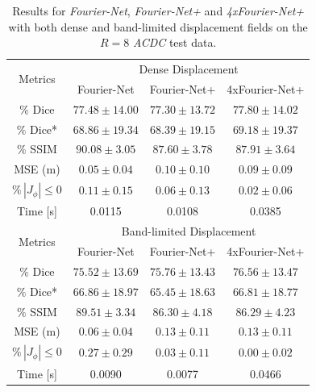 \begin{table}[h] %
	\centering
	\caption{Results for \emph{Fourier-Net}, \emph{Fourier-Net+} and \emph{4xFourier-Net+} with both dense and band-limited displacement fields on the $R=8$ \emph{ACDC} test data.}
	\label{tab:DenseDisplacementAcc8}
	\begin{tabular}{c c c c} %
		\toprule
		\multirow{2}{*}{Metrics} & \multicolumn{3}{c}{Dense Displacement} \\
		\cmidrule(lr){2-4} 
		 & Fourier-Net & Fourier-Net+ & 4xFourier-Net+\\	
		\midrule
		$\%$ Dice & $77.48 \pm 14.00$ & $77.30 \pm 13.72$ & $77.80 \pm 14.02$\\
		$\%$ Dice* & $68.86 \pm 19.34$ & $68.39 \pm 19.15$ & $69.18 \pm 19.37$ \\
		$\%$ SSIM & $90.08 \pm 3.05$ & $87.60 \pm 3.78$ & $87.91 \pm 3.64$\\
		MSE (m) & $0.05 \pm 0.04$ & $0.10 \pm 0.10$ & $0.09 \pm 0.09$ \\
		$\% \, |J_{\phi}|\leq0$ & $0.11 \pm 0.15$ & $0.06 \pm 0.13$ & $0.02 \pm 0.06$ \\
		Time [s] 	  & 0.0115 & 0.0108 & 0.0385  \\
		\midrule
		\multirow{2}{*}{Metrics} & \multicolumn{3}{c}{Band-limited Displacement} \\
		\cmidrule(lr){2-4} 
		 & Fourier-Net & Fourier-Net+ & 4xFourier-Net+\\		
		\midrule
		$\%$ Dice & $75.52 \pm 13.69$ & $75.76 \pm 13.43$ & $76.56 \pm 13.47$\\
		$\%$ Dice* & $66.86 \pm 18.97$ & $65.45 \pm 18.63$ & $66.81 \pm 18.77$ \\
		$\%$ SSIM & $89.51 \pm 3.34$ & $86.30 \pm 4.18$ & $86.29 \pm 4.23$\\
		MSE (m) & $0.06 \pm 0.04$ & $0.13 \pm 0.11$ & $0.13 \pm 0.11$ \\
		$\% \, |J_{\phi}|\leq0$ & $0.27 \pm 0.29$ & $0.03 \pm 0.11$ & $0.00 \pm 0.02$ \\
		Time [s] 	  & 0.0090 & 0.0077 & 0.0466  \\
		\bottomrule
	\end{tabular}	
\end{table}


